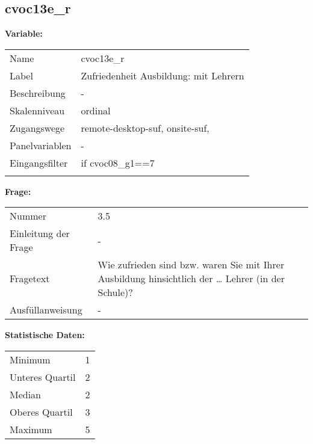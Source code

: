 	
	
	\subsection{cvoc13e\_r}
	\label{subSection:cvoc13e_r}

	\noindent\textbf{Variable:}\\
		\begin{tabular}{lL{11.3cm}}
			\label{tableVariable:cvoc13e_r}
			Name & cvoc13e\_r \\
			Label & Zufriedenheit Ausbildung: mit Lehrern \\
			Beschreibung & - \\
			Skalenniveau & ordinal \\
			Zugangswege &
				remote-desktop-suf,
				onsite-suf,
 \\
			Panelvariablen & -
			 \\
			Eingangsfilter & if cvoc08\_g1==7 \\
 \\
		\end{tabular}

		\vspace*{1 cm}
		\noindent\textbf{Frage:}\\
		\begin{tabular}{lL{11.3cm}}
			\label{tableQuestion:cvoc13e_r}
			Nummer & 3.5 \\
			Einleitung der Frage & - \\
			Fragetext & Wie zufrieden sind bzw. waren Sie mit Ihrer Ausbildung hinsichtlich der …
Lehrer (in der Schule)? \\
			Ausfüllanweisung & - \\
		\end{tabular}


		\vspace*{1 cm}
		\noindent\textbf{Statistische Daten:}\\
			\begin{tabular}{ll}
				\label{tableStatistics:cvoc13e_r}
					Minimum & 1 \\
					Unteres Quartil & 2 \\
					Median & 2 \\
					Oberes Quartil & 3 \\
					Maximum & 5 \\
			\end{tabular}



